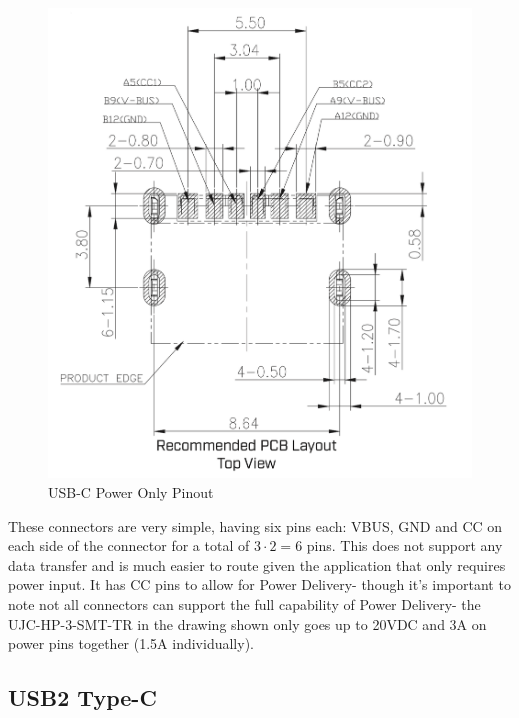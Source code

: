 \documentclass[12pt]{article}
\begin{document}
\begin{figure}[h]
	\centering
	\includegraphics[width=.8\linewidth]{images/CUI-Devices-Power-Only.png}
	\caption{USB-C Power Only Pinout\protect\footnotemark}
	\label{fig:usb-c-pinout-power-only-CUI}
\end{figure}


\noindent
These connectors are very simple, having six pins each: VBUS, GND and CC on each side of the connector for a total of $3\cdot2 = 6$ pins. This does not support any data transfer and is much easier to route given the application that only requires power input. It has CC pins to allow for Power Delivery- though it's important to note not all connectors can support the full capability of Power Delivery- the UJC-HP-3-SMT-TR in the drawing shown only goes up to 20VDC and 3A on power pins together (1.5A individually). 


\newpage

\subsection{USB2 Type-C}
\end{document}
